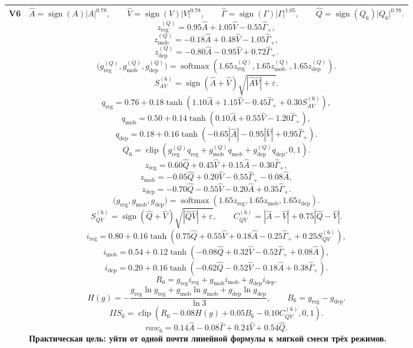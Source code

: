 \documentclass[12pt,a4paper]{article}
\newcommand{\sgn}{\operatorname{sign}}
\newcommand{\clip}{\operatorname{clip}}
\newcommand{\softmax}{\operatorname{softmax}}
\newcommand{\spow}[2]{\sgn(#1)\lvert #1 \rvert^{#2}}
\begin{document}
\begin{landscape}
\begin{longtable}{>{\raggedright\arraybackslash}p{1.6cm} >{\raggedright\arraybackslash}p{16.7cm}}
\textbf{V6} &
\[
\widehat{A}=\spow{A}{0.78},\qquad
\widehat{V}=\spow{V}{0.78},\qquad
\widehat{\Gamma}=\spow{\Gamma}{1.05},\qquad
\widehat{Q}=\spow{Q_6}{0.78}.
\]
\[
z^{(Q)}_{\mathrm{reg}}=0.95\widehat{A}+1.05\widehat{V}-0.55\widehat{\Gamma}_+,
\]
\[
z^{(Q)}_{\mathrm{mob}}=-0.18\widehat{A}+0.48\widehat{V}-1.05\widehat{\Gamma}_+,
\]
\[
z^{(Q)}_{\mathrm{dep}}=-0.80\widehat{A}-0.95\widehat{V}+0.72\widehat{\Gamma}_+.
\]
\[
\bigl(g^{(Q)}_{\mathrm{reg}},g^{(Q)}_{\mathrm{mob}},g^{(Q)}_{\mathrm{dep}}\bigr)
=\softmax\!\left(
1.65 z^{(Q)}_{\mathrm{reg}},
1.65 z^{(Q)}_{\mathrm{mob}},
1.65 z^{(Q)}_{\mathrm{dep}}
\right).
\]
\[
S_{AV}^{(6)}=\sgn(\widehat{A}+\widehat{V})\sqrt{|\widehat{A}\widehat{V}|+\varepsilon}.
\]
\[
q_{\mathrm{reg}}=0.76+0.18\tanh\!\left(1.10\widehat{A}+1.15\widehat{V}-0.45\widehat{\Gamma}_++0.30S_{AV}^{(6)}\right),
\]
\[
q_{\mathrm{mob}}=0.50+0.14\tanh\!\left(0.10\widehat{A}+0.55\widehat{V}-1.20\widehat{\Gamma}_+\right),
\]
\[
q_{\mathrm{dep}}=0.18+0.16\tanh\!\left(-0.65|\widehat{A}|-0.95|\widehat{V}|+0.95\widehat{\Gamma}_+\right).
\]
\[
Q_6=\clip\!\left(
g^{(Q)}_{\mathrm{reg}}q_{\mathrm{reg}}+
g^{(Q)}_{\mathrm{mob}}q_{\mathrm{mob}}+
g^{(Q)}_{\mathrm{dep}}q_{\mathrm{dep}},
0,1\right).
\]
\[
z_{\mathrm{reg}}=0.60\widehat{Q}+0.45\widehat{V}+0.15\widehat{A}-0.30\widehat{\Gamma}_+,
\]
\[
z_{\mathrm{mob}}=-0.05\widehat{Q}+0.20\widehat{V}-0.55\widehat{\Gamma}_+-0.08\widehat{A},
\]
\[
z_{\mathrm{dep}}=-0.70\widehat{Q}-0.55\widehat{V}-0.20\widehat{A}+0.35\widehat{\Gamma}_+.
\]
\[
\bigl(g_{\mathrm{reg}},g_{\mathrm{mob}},g_{\mathrm{dep}}\bigr)
=\softmax\!\left(1.65z_{\mathrm{reg}},1.65z_{\mathrm{mob}},1.65z_{\mathrm{dep}}\right).
\]
\[
S_{QV}^{(6)}=\sgn(\widehat{Q}+\widehat{V})\sqrt{|\widehat{Q}\widehat{V}|+\varepsilon},
\qquad
C_{QV}^{(6)}=|\widehat{A}-\widehat{V}|+0.75|\widehat{Q}-\widehat{V}|.
\]
\[
i_{\mathrm{reg}}=
0.80+0.16\tanh\!\left(
0.75\widehat{Q}+0.55\widehat{V}+0.18\widehat{A}-0.25\widehat{\Gamma}_++0.25S_{QV}^{(6)}
\right),
\]
\[
i_{\mathrm{mob}}=
0.54+0.12\tanh\!\left(
-0.08\widehat{Q}+0.32\widehat{V}-0.52\widehat{\Gamma}_++0.08\widehat{A}
\right),
\]
\[
i_{\mathrm{dep}}=
0.20+0.16\tanh\!\left(
-0.62\widehat{Q}-0.52\widehat{V}-0.18\widehat{A}+0.38\widehat{\Gamma}_+
\right).
\]
\[
R_6=g_{\mathrm{reg}}i_{\mathrm{reg}}+g_{\mathrm{mob}}i_{\mathrm{mob}}+g_{\mathrm{dep}}i_{\mathrm{dep}}.
\]
\[
H(g)=-
\frac{
g_{\mathrm{reg}}\ln g_{\mathrm{reg}}+
g_{\mathrm{mob}}\ln g_{\mathrm{mob}}+
g_{\mathrm{dep}}\ln g_{\mathrm{dep}}
}{\ln 3},
\qquad
B_6=g_{\mathrm{reg}}-g_{\mathrm{dep}}.
\]
\[
IIS_6=\clip\!\left(
R_6-0.08H(g)+0.05B_6-0.10C_{QV}^{(6)},
0,1\right).
\]
\[
raw_6=0.14\widehat{A}-0.08\widehat{\Gamma}+0.24\widehat{V}+0.54\widehat{Q}.
\]
\textbf{Практическая цель:} уйти от одной почти линейной формулы к мягкой смеси трёх режимов. \\

\bottomrule
\end{longtable}
\end{landscape}
\end{document}
